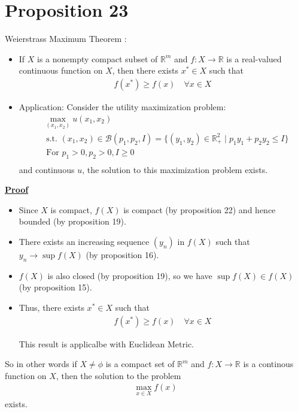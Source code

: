 \documentclass[12pt,a4paper]{article}
\begin{document}
\section{Proposition 23}
Weierstrass Maximum Theorem :
\begin{itemize}
    \item If \(X\) is a nonempty compact subset of \(\mathbb{R}^m\) and \(f: X \rightarrow \mathbb{R}\) is a real-valued continuous function on \(X\), then there exists \(x^* \in X\) such that
    \begin{align*}
    f\left(x^*\right) \geq f(x) \quad \forall x \in X
    \end{align*}
    \item Application: Consider the utility maximization problem: 
     \begin{align*}
        &\max _{\left(x_1, x_2\right)} u\left(x_1, x_2\right) \\
        &\text{ s.t. } \left(x_1, x_2\right) \in \mathcal{B}\left(p_1, p_2, I\right)=\{\left(y_1, y_2\right) \in \mathbb{R}_{+}^2 \mid p_1 y_1+p_2 y_2 \leq I\}\\ 
        &\text{ For } p_1>0, p_2>0, I \geq 0\\
    \end{align*}
    and continuous \(u\), the solution to this maximization problem exists.
\end{itemize}
\underline{\textbf{Proof}}
\begin{itemize}
    \item Since \(X\) is compact, \(f(X)\) is compact (by proposition 22) and hence bounded (by proposition 19).
    \item There exists an increasing sequence \(\left(y_n\right)\) in \(f(X)\) such that \(y_n \rightarrow \sup f(X)\) (by proposition 16).
    \item \(f(X)\) is also closed (by proposition 19), so we have \(\sup f(X) \in f(X)\) (by proposition 15).
    \item Thus, there exists \(x^* \in X\) such that
     \begin{align*}
    f\left(x^*\right) \geq f(x) \quad \forall x \in X
    \end{align*}

    This result is applicalbe with Euclidean Metric.
\end{itemize}

So in other words if \(X \neq \phi \) is a compact set of \(\mathbb{R}^m\) and \(f: X \to \mathbb{R}\) is a continous function on \(X\), then the solution to the problem
 \begin{align*}
    \max_{x \in X} f(x) 
\end{align*}
exists.
\end{document}
